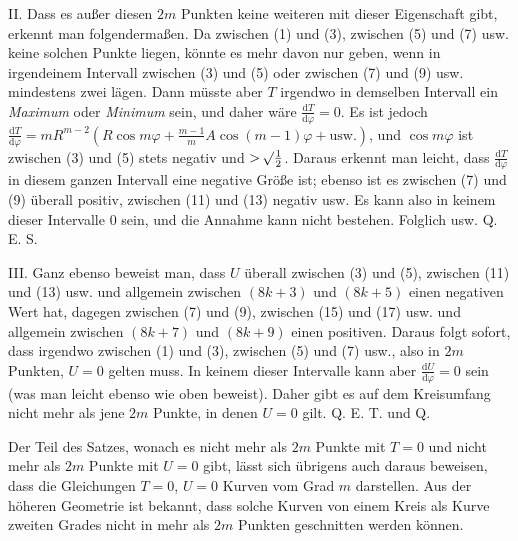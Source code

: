 II. Dass es außer diesen $2m$ Punkten keine weiteren mit dieser Eigenschaft gibt, erkennt man folgendermaßen. Da zwischen (1) und (3), zwischen (5) und (7) usw. keine solchen Punkte liegen, könnte es mehr davon nur geben, wenn in irgendeinem Intervall zwischen (3) und (5) oder zwischen (7) und (9) usw. mindestens zwei lägen. Dann müsste aber $T$ irgendwo in demselben Intervall ein \textit{Maximum} oder \textit{Minimum} sein, und daher wäre $\frac{\mathrm dT}{\mathrm d\varphi}=0$. Es ist jedoch $\frac{\mathrm dT}{\mathrm d\varphi}=mR^{m-2}(R\cos m\varphi+\frac{m-1}mA\cos(m-1)\varphi+\text{usw.})$, und $\cos m\varphi$ ist zwischen (3) und (5) stets negativ und $>\mathord{{}^{}\!\surd}\frac12$. Daraus erkennt man leicht, dass $\frac{\mathrm dT}{\mathrm d\varphi}$ in diesem ganzen Intervall eine negative Größe ist; ebenso ist es zwischen (7) und (9) überall positiv, zwischen (11) und (13) negativ usw. Es kann also in keinem dieser Intervalle 0 sein, und die Annahme kann nicht bestehen. Folglich usw. Q. E. S.

III. Ganz ebenso beweist man, dass $U$ überall zwischen (3) und (5), zwischen (11) und (13) usw. und allgemein zwischen $(8k+3)$ und $(8k+5)$ einen negativen Wert hat, dagegen zwischen (7) und (9), zwischen (15) und (17) usw. und allgemein zwischen $(8k+7)$ und $(8k+9)$ einen positiven. Daraus folgt sofort, dass irgendwo zwischen (1) und (3), zwischen (5) und (7) usw., also in $2m$ Punkten, $U=0$ gelten muss. In keinem dieser Intervalle kann aber $\frac{\mathrm dU}{\mathrm d\varphi}=0$ sein (was man leicht ebenso wie oben beweist). Daher gibt es auf dem Kreisumfang nicht mehr als jene $2m$ Punkte, in denen $U=0$ gilt. Q. E. T. und Q.

Der Teil des Satzes, wonach es nicht mehr als $2m$ Punkte mit $T=0$ und nicht mehr als $2m$ Punkte mit $U=0$ gibt, lässt sich übrigens auch daraus beweisen, dass die Gleichungen $T=0$, $U=0$ Kurven vom Grad $m$ darstellen. Aus der höheren Geometrie ist bekannt, dass solche Kurven von einem Kreis als Kurve zweiten Grades nicht in mehr als $2m$ Punkten geschnitten werden können.

